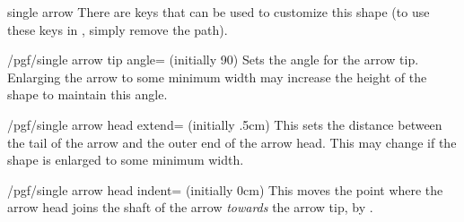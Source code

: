 \begin{shape}{single arrow}
    There are \pgfname{} keys that can be used to customize this shape (to use
    these keys in \tikzname{}, simply remove the  path).

    \begin{key}{/pgf/single arrow tip angle= (initially 90)}
        Sets the angle for the arrow tip. Enlarging the arrow to some minimum
        width may increase the height of the shape to maintain this angle.
    \end{key}

    \begin{key}{/pgf/single arrow head extend= (initially .5cm)}
        This sets the distance between the tail of the arrow and the outer end
        of the arrow head. This may change if the shape is enlarged to some
        minimum width.
\begin{codeexample}[preamble={\usetikzlibrary{shapes.arrows}}]
\end{codeexample}
\end{key}

    \begin{key}{/pgf/single arrow head indent= (initially 0cm)}
        This moves the point where the arrow head joins the shaft of the arrow
        \emph{towards} the arrow tip, by .
\begin{codeexample}[preamble={\usetikzlibrary{shapes.arrows}}]
\end{codeexample}
    \end{key}


\end{shape}
